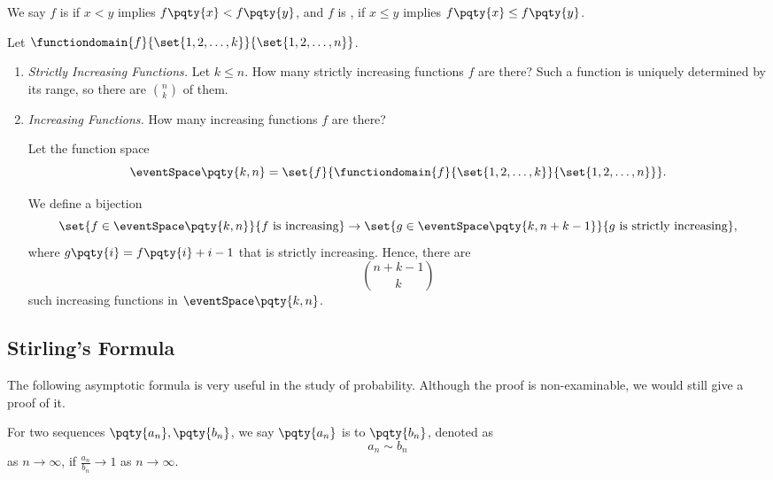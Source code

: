 \begin{examples}
    \label{ex:increasing-functions}%
    We say \(f\) is  if \(x < y\) implies \(f\pqty{x} < f\pqty{y}\), and \(f\) is , if \(x \leq y\) implies \(f\pqty{x} \leq f\pqty{y}\).

    Let \(\functiondomain{f}{\set{1, 2, \ldots, k}}{\set{1, 2, \ldots, n}}\).
    
    \begin{enumerate}
        \item \textit{Strictly Increasing Functions.} Let \(k \leq n\). How many strictly increasing functions \(f\) are there? Such a function is uniquely determined by its range, so there are \(\binom{n}{k}\) of them.
        \item \textit{Increasing Functions.} How many increasing functions \(f\) are there?
        
        Let the function space
        \[
            \eventSpace\pqty{k, n} = \set{f}{\functiondomain{f}{\set{1, 2, \ldots, k}}{\set{1, 2, \ldots, n}}}.
        \]
        
        We define a bijection
        \[
            \set{f \in \eventSpace\pqty{k, n}}{f \text{ is increasing}} \to \set{g \in \eventSpace\pqty{k, n + k - 1}}{g \text{ is strictly increasing}},
        \]
        where \(g\pqty{i} = f\pqty{i} + i - 1\) that is strictly increasing. Hence, there are
        \[
            \binom{n + k - 1}{k}
        \]
        such increasing functions in \(\eventSpace\pqty{k, n}\).
    \end{enumerate}
\end{examples}

\subsection{Stirling's Formula}

The following asymptotic formula is very useful in the study of probability. Although the proof is non-examinable, we would still give a proof of it.

\begin{definition}[Asymptotic]
    \label{def:asymptotic}%
    For two sequences \(\pqty{a_n}, \pqty{b_n}\), we say \(\pqty{a_n}\) is  to \(\pqty{b_n}\), denoted as
    \[
        a_n \sim b_n
    \]
    as \(n \to \infty\), if \(\frac{a_n}{b_n} \to 1\) as \(n \to \infty\).
\end{definition}

